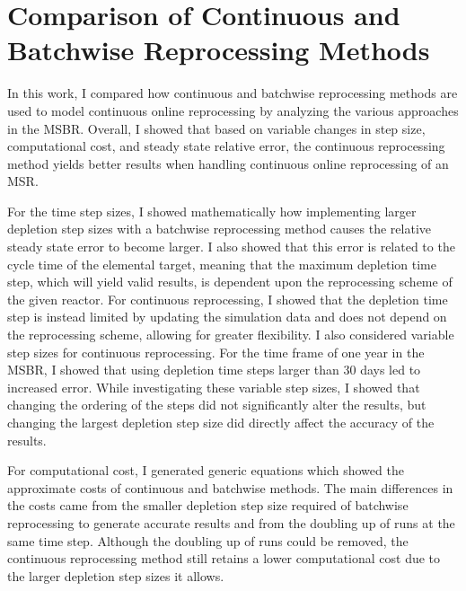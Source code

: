\renewcommand*\descriptionlabel[1]{\hspace\leftmargin$#1$}
\setcounter{tocdepth}{5}
\setcounter{secnumdepth}{5}

\section{Comparison of Continuous and Batchwise Reprocessing Methods}

In this work, I compared how continuous and batchwise reprocessing methods are used to model continuous online reprocessing by analyzing the various approaches in the MSBR.
Overall, I showed that based on variable changes in step size, computational cost, and steady state relative error, the continuous reprocessing method yields better results when handling continuous online reprocessing of an MSR.

For the time step sizes, I showed mathematically how implementing larger depletion step sizes with a batchwise reprocessing method causes the relative steady state error to become larger.
I also showed that this error is related to the cycle time of the elemental target, meaning that the maximum depletion time step, which will yield valid results, is dependent upon the reprocessing scheme of the given reactor.
For continuous reprocessing, I showed that the depletion time step is instead limited by updating the simulation data and does not depend on the reprocessing scheme, allowing for greater flexibility.
I also considered variable step sizes for continuous reprocessing.
For the time frame of one year in the MSBR, I showed that using depletion time steps larger than 30 days led to increased error.
While investigating these variable step sizes, I showed that changing the ordering of the steps did not significantly alter the results, but changing the largest depletion step size did directly affect the accuracy of the results.

For computational cost, I generated generic equations which showed the approximate costs of continuous and batchwise methods. The main differences in the costs came from the smaller depletion step size required of batchwise reprocessing to generate accurate results and from the doubling up of runs at the same time step.
Although the doubling up of runs could be removed, the continuous reprocessing method still retains a lower computational cost due to the larger depletion step sizes it allows.

